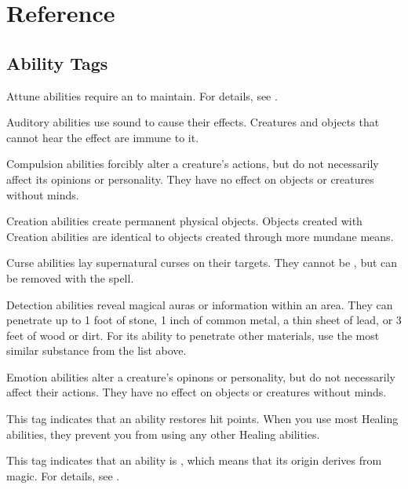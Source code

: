 \chapter{Reference}\label{Reference}

\section{Ability Tags}\label{Ability Tags}

     Attune abilities require an  to maintain.
    For details, see .

     Auditory abilities use sound to cause their effects.
    Creatures and objects that cannot hear the effect are immune to it.

     Compulsion abilities forcibly alter a creature's actions, but do not necessarily affect its opinions or personality.
    They have no effect on objects or creatures without minds.

     Creation abilities create permanent physical objects.
    Objects created with Creation abilities are identical to objects created through more mundane means.

     Curse abilities lay supernatural curses on their targets.
    They cannot be , but can be removed with the  spell.

    \label{Detection} Detection abilities reveal magical auras or information within an area.
    They can penetrate up to 1 foot of stone, 1 inch of common metal, a thin sheet of lead, or 3 feet of wood or dirt.
    For its ability to penetrate other materials, use the most similar substance from the list above.

     Emotion abilities alter a creature's opinons or personality, but do not necessarily affect their actions.
    They have no effect on objects or creatures without minds.

     This tag indicates that an ability restores hit points.
    When you use most Healing abilities, they  prevent you from using any other Healing abilities.

     This tag indicates that an ability is , which means that its origin derives from magic.
    For details, see .

